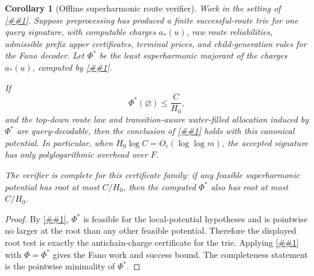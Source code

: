 \documentclass[10pt]{article}
\newcommand{\cref}[1]{\ref{##1}}
\newtheorem{corollary}[theorem]{Corollary}
\theoremstyle{definition}
\begin{document}
\begin{corollary}[Offline superharmonic route verifier]
   \label{cor:offline-superharmonic-route-verifier}
   Work in the setting of \cref{cor:local-potential-antichain-fano}.  Suppose
   preprocessing has produced a finite successful-route trie for one query
   signature, with computable charges \(a_*(u)\), raw route reliabilities,
   admissible prefix upper certificates, terminal prices, and child-generation
   rules for the Fano decoder.  Let \(\Phi^*\) be the least superharmonic
   majorant of the charges \(a_*(u)\), computed by
   \cref{lem:least-superharmonic-majorant}.

   If
   \[
      \Phi^*(\varnothing)\le \frac{C}{H_0},
   \]
   and the top-down route law and transition-aware water-filled allocation
   induced by \(\Phi^*\) are query-decodable, then the conclusion of
   \cref{cor:local-potential-antichain-fano} holds with this canonical
   potential.  In particular, when \(H_0\log C=O_c(\log\log m)\), the accepted
   signature has only polylogarithmic overhead over \(F\).

   The verifier is complete for this certificate family: if any feasible
   superharmonic potential has root at most \(C/H_0\), then the computed
   \(\Phi^*\) also has root at most \(C/H_0\).
\end{corollary}

\begin{proof}
   By \cref{lem:least-superharmonic-majorant}, \(\Phi^*\) is feasible for the
   local-potential hypotheses and is pointwise no larger at the root than any
   other feasible potential.  Therefore the displayed root test is exactly the
   antichain-charge certificate for the trie.  Applying
   \cref{cor:local-potential-antichain-fano} with \(\Phi=\Phi^*\) gives the
   Fano work and success bound.  The completeness statement is the pointwise
   minimality of \(\Phi^*\).
\end{proof}
\end{document}
